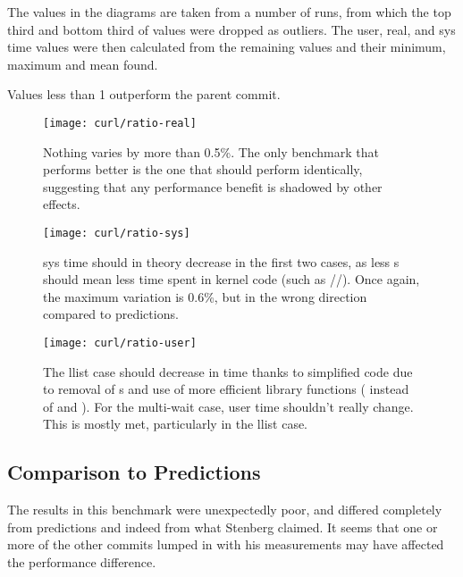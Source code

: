 The values in the diagrams are taken from a number of runs, from which the top third and bottom third of values were dropped as outliers. The user, real, and sys time values were then calculated from the remaining values and their minimum, maximum and mean found.

Values less than 1 outperform the parent commit.

\begin{figure}[h]
	\centering
	\texttt{[image: curl/ratio-real]}
	\caption{Nothing varies by more than 0.5\%. The only benchmark that performs better is the one that should perform identically, suggesting that any performance benefit is shadowed by other effects.}\label{firstcurl}
\end{figure}

\begin{figure}[p]
	\centering
	\texttt{[image: curl/ratio-sys]}
	\caption{sys time should in theory decrease in the first two cases, as less \malloc{}s should mean less time spent in kernel code (such as //). Once again, the maximum variation is 0.6\%, but in the wrong direction compared to predictions.}
\end{figure}

\begin{figure}[p]
	\centering
	\texttt{[image: curl/ratio-user]}
	\caption{The llist case should decrease in time thanks to simplified code due to removal of \malloc{}s and use of more efficient library functions ( instead of \malloc{} and ). For the multi-wait case, user time shouldn't really change. This is mostly met, particularly in the llist case.}\label{lastcurl}
\end{figure}

\subsection{Comparison to Predictions}

The results in this benchmark were unexpectedly poor, and differed completely from predictions and indeed from what Stenberg claimed. It seems that one or more of the other commits lumped in with his measurements may have affected the performance difference.
